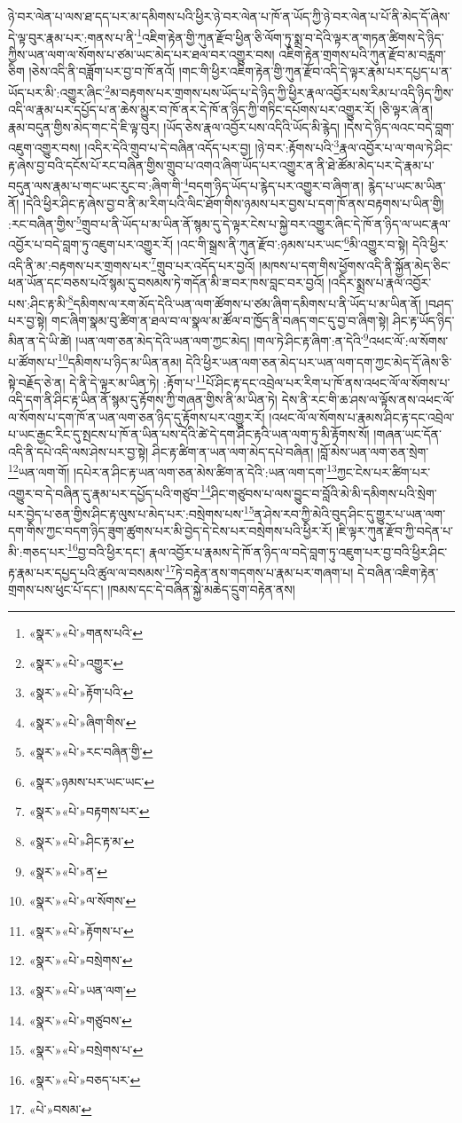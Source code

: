 ཉེ་བར་ལེན་པ་ལས་ཐ་དད་པར་མ་དམིགས་པའི་ཕྱིར་ཉེ་བར་ལེན་པ་ཁོ་ན་ཡོད་ཀྱི་ཉེ་བར་ལེན་པ་པོ་ནི་མེད་དོ་ཞེས་དེ་ལྟ་བུར་རྣམ་པར་:གནས་པ་ནི་\footnote{«སྣར་»«པེ་»གནས་པའི་}འཇིག་རྟེན་གྱི་ཀུན་རྫོབ་ཕྱིན་ཅི་ལོག་ཏུ་སྨྲ་བ་དེའི་ལྟར་ན་གཏན་ཚིགས་དེ་ཉིད་ཀྱིས་ཡན་ལག་ལ་སོགས་པ་ཙམ་ཡང་མེད་པར་ཐལ་བར་འགྱུར་བས། འཇིག་རྟེན་གྲགས་པའི་ཀུན་རྫོབ་མ་བརླག་ཅིག །ཅེས་འདི་ནི་བཟློག་པར་བྱ་བ་ཁོ་ནའོ། །གང་གི་ཕྱིར་འཇིག་རྟེན་གྱི་ཀུན་རྫོབ་འདི་དེ་ལྟར་རྣམ་པར་དཔྱད་པ་ན་ཡོད་པར་མི་:འགྱུར་ཞིང་\footnote{«སྣར་»«པེ་»འགྱུར་}མ་བརྟགས་པར་གྲགས་པས་ཡོད་པ་དེ་ཉིད་ཀྱི་ཕྱིར་རྣལ་འབྱོར་པས་རིམ་པ་འདི་ཉིད་ཀྱིས་འདི་ལ་རྣམ་པར་དཔྱོད་པ་ན་ཆེས་མྱུར་བ་ཁོ་ནར་དེ་ཁོ་ན་ཉིད་ཀྱི་གཏིང་དཔོགས་པར་འགྱུར་རོ། །ཅི་ལྟར་ཞེ་ན། རྣམ་བདུན་གྱིས་མེད་གང་དེ་ཇི་ལྟ་བུར། །ཡོད་ཅེས་རྣལ་འབྱོར་པས་འདིའི་ཡོད་མི་རྙེད། །དེས་དེ་ཉིད་ལའང་བདེ་བླག་འཇུག་འགྱུར་བས། །འདིར་དེའི་གྲུབ་པ་དེ་བཞིན་འདོད་པར་བྱ། །ཉེ་བར་:རྟོགས་པའི་\footnote{«སྣར་»«པེ་»རྟོག་པའི་}རྣལ་འབྱོར་པ་ལ་གལ་ཏེ་ཤིང་རྟ་ཞེས་བྱ་བའི་དངོས་པོ་རང་བཞིན་གྱིས་གྲུབ་པ་འགའ་ཞིག་ཡོད་པར་འགྱུར་ན་ནི་ཐེ་ཚོམ་མེད་པར་དེ་རྣམ་པ་བདུན་ལས་རྣམ་པ་གང་ཡང་རུང་བ་:ཞིག་གི་\footnote{«སྣར་»«པེ་»ཞིག་གིས་}བདག་ཉིད་ཡོད་པ་རྙེད་པར་འགྱུར་བ་ཞིག་ན། རྙེད་པ་ཡང་མ་ཡིན་ནོ། །དེའི་ཕྱིར་ཤིང་རྟ་ཞེས་བྱ་བ་ནི་མ་རིག་པའི་ལིང་ཐོག་གིས་ཉམས་པར་བྱས་པ་དག་ཁོ་ནས་བརྟགས་པ་ཡིན་གྱི། :རང་བཞིན་གྱིས་\footnote{«སྣར་»«པེ་»རང་བཞིན་གྱི་}གྲུབ་པ་ནི་ཡོད་པ་མ་ཡིན་ནོ་སྙམ་དུ་དེ་ལྟར་ངེས་པ་སྐྱེ་བར་འགྱུར་ཞིང་དེ་ཁོ་ན་ཉིད་ལ་ཡང་རྣལ་འབྱོར་པ་བདེ་བླག་ཏུ་འཇུག་པར་འགྱུར་རོ། །འང་གི་སྒྲས་ནི་ཀུན་རྫོབ་:ཉམས་པར་ཡང་\footnote{«སྣར་»ཉམས་པར་ཡང་ཡང་}མི་འགྱུར་བ་སྟེ། དེའི་ཕྱིར་འདི་ནི་མ་:བརྟགས་པར་གྲགས་པར་\footnote{«སྣར་»«པེ་»བརྟགས་པར་}གྲུབ་པར་འདོད་པར་བྱའོ། །མཁས་པ་དག་གིས་ཕྱོགས་འདི་ནི་སྐྱོན་མེད་ཅིང་ཕན་ཡོན་དང་བཅས་པའོ་སྙམ་དུ་བསམས་ཏེ་གདོན་མི་ཟ་བར་ཁས་བླང་བར་བྱའོ། །འདིར་སྨྲས་པ་རྣལ་འབྱོར་པས་:ཤིང་རྟ་མི་\footnote{«སྣར་»«པེ་»ཤིང་རྟ་མ་}དམིགས་ལ་རག་མོད་དེའི་ཡན་ལག་ཚོགས་པ་ཙམ་ཞིག་དམིགས་པ་ནི་ཡོད་པ་མ་ཡིན་ནོ། །བཤད་པར་བྱ་སྟེ། གང་ཞིག་སྣམ་བུ་ཚིག་ན་ཐལ་བ་ལ་སྣལ་མ་ཚོལ་བ་ཁྱོད་ནི་བཞད་གང་དུ་བྱ་བ་ཞིག་སྟེ། ཤིང་རྟ་ཡོད་ཉིད་མིན་ན་དེ་ཡི་ཚེ། །ཡན་ལག་ཅན་མེད་དེའི་ཡན་ལག་ཀྱང་མེད། །གལ་ཏེ་ཤིང་རྟ་ཞིག་:ན་དེའི་\footnote{«སྣར་»«པེ་»ན་}འཕང་ལོ་:ལ་སོགས་པ་ཚོགས་པ་\footnote{«སྣར་»«པེ་»ལ་སོགས་}དམིགས་པ་ཉིད་མ་ཡིན་ནམ། དེའི་ཕྱིར་ཡན་ལག་ཅན་མེད་པར་ཡན་ལག་དག་ཀྱང་མེད་དོ་ཞེས་ཅི་སྟེ་བརྗོད་ཅེ་ན། དེ་ནི་དེ་ལྟར་མ་ཡིན་ཏེ། :རྟོག་པ་\footnote{«སྣར་»«པེ་»རྟོགས་པ་}པོ་ཤིང་རྟ་དང་འབྲེལ་པར་རིག་པ་ཁོ་ནས་འཕང་ལོ་ལ་སོགས་པ་འདི་དག་ནི་ཤིང་རྟ་ཡིན་ནོ་སྙམ་དུ་རྟོགས་ཀྱི་གཞན་གྱིས་ནི་མ་ཡིན་ཏེ། དེས་ནི་རང་གི་ཆ་ཤས་ལ་ལྟོས་ནས་འཕང་ལོ་ལ་སོགས་པ་དག་ཁོ་ན་ཡན་ལག་ཅན་ཉིད་དུ་རྟོགས་པར་འགྱུར་རོ། །འཕང་ལོ་ལ་སོགས་པ་རྣམས་ཤིང་རྟ་དང་འབྲེལ་པ་ཡང་རྒྱང་རིང་དུ་སྤངས་པ་ཁོ་ན་ཡིན་པས་དེའི་ཚེ་དེ་དག་ཤིང་རྟའི་ཡན་ལག་ཏུ་མི་རྟོགས་སོ། །གཞན་ཡང་དོན་འདི་ནི་དཔེ་འདི་ལས་ཤེས་པར་བྱ་སྟེ། ཤིང་རྟ་ཚིག་ན་ཡན་ལག་མེད་དཔེ་བཞིན། །བློ་མེས་ཡན་ལག་ཅན་སྲེག་\footnote{«སྣར་»«པེ་»བསྲེགས་}ཡན་ལག་གོ། །དཔེར་ན་ཤིང་རྟ་ཡན་ལག་ཅན་མེས་ཚིག་ན་དེའི་:ཡན་ལག་དག་\footnote{«སྣར་»«པེ་»ཡན་ལག་}ཀྱང་ངེས་པར་ཚིག་པར་འགྱུར་བ་དེ་བཞིན་དུ་རྣམ་པར་དཔྱོད་པའི་གཙུབ་\footnote{«སྣར་»«པེ་»གཙུབས་}ཤིང་གཙུབས་པ་ལས་བྱུང་བ་བློའི་མེ་མི་དམིགས་པའི་སྲེག་པར་བྱེད་པ་ཅན་གྱིས་ཤིང་རྟ་ལུས་པ་མེད་པར་:བསྲེགས་པས་\footnote{«སྣར་»«པེ་»བསྲེགས་པ་}ན་ཤེས་རབ་ཀྱི་མེའི་བུད་ཤིང་དུ་གྱུར་པ་ཡན་ལག་དག་གིས་ཀྱང་བདག་ཉིད་ཟུག་ཚུགས་པར་མི་བྱེད་དེ་ངེས་པར་བསྲེགས་པའི་ཕྱིར་རོ། །ཇི་ལྟར་ཀུན་རྫོབ་ཀྱི་བདེན་པ་མི་:གཅད་པར་\footnote{«སྣར་»«པེ་»བཅད་པར་}བྱ་བའི་ཕྱིར་དང་། རྣལ་འབྱོར་པ་རྣམས་དེ་ཁོ་ན་ཉིད་ལ་བདེ་བླག་ཏུ་འཇུག་པར་བྱ་བའི་ཕྱིར་ཤིང་རྟ་རྣམ་པར་དཔྱད་པའི་ཚུལ་ལ་བསམས་\footnote{«པེ་»བསམ་}ཏེ་བརྟེན་ནས་གདགས་པ་རྣམ་པར་གཞག་པ། དེ་བཞིན་འཇིག་རྟེན་གྲགས་པས་ཕུང་པོ་དང་། །ཁམས་དང་དེ་བཞིན་སྐྱེ་མཆེད་དྲུག་བརྟེན་ནས། 